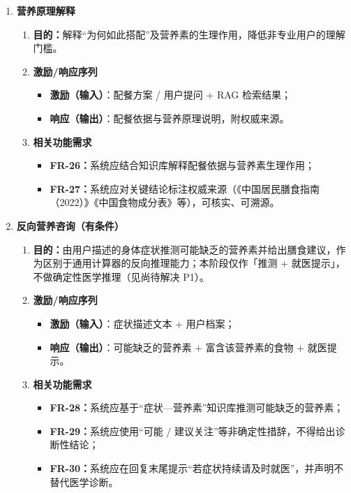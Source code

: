 \documentclass[12pt,a4paper]{ctexart}
\begin{document}
\begin{enumerate}
\item \textbf{营养原理解释}
  \begin{enumerate}[label=(\arabic*), leftmargin=10pt, itemsep=2pt, topsep=2pt]
    \item \textbf{目的：}解释“为何如此搭配”及营养素的生理作用，降低非专业用户的理解门槛。
    \item \textbf{激励/响应序列}
      \begin{itemize}[leftmargin=*, itemsep=1pt, topsep=1pt]
        \item \textbf{激励（输入）}：配餐方案 / 用户提问 + RAG 检索结果；
        \item \textbf{响应（输出）}：配餐依据与营养原理说明，附权威来源。
      \end{itemize}
    \item \textbf{相关功能需求}
      \begin{itemize}[leftmargin=*, itemsep=1pt, topsep=1pt]
        \item \textbf{FR-26：}系统应结合知识库解释配餐依据与营养素生理作用；
        \item \textbf{FR-27：}系统应对关键结论标注权威来源（《中国居民膳食指南（2022）》《中国食物成分表》等），可核实、可溯源。
      \end{itemize}
  \end{enumerate}

\item \textbf{反向营养咨询（有条件）}
  \begin{enumerate}[label=(\arabic*), leftmargin=10pt, itemsep=2pt, topsep=2pt]
    \item \textbf{目的：}由用户描述的身体症状推测可能缺乏的营养素并给出膳食建议，作为区别于通用计算器的反向推理能力；本阶段仅作「推测 + 就医提示」，不做确定性医学推理（见尚待解决 P1）。
    \item \textbf{激励/响应序列}
      \begin{itemize}[leftmargin=*, itemsep=1pt, topsep=1pt]
        \item \textbf{激励（输入）}：症状描述文本 + 用户档案；
        \item \textbf{响应（输出）}：可能缺乏的营养素 + 富含该营养素的食物 + 就医提示。
      \end{itemize}
    \item \textbf{相关功能需求}
      \begin{itemize}[leftmargin=*, itemsep=1pt, topsep=1pt]
        \item \textbf{FR-28：}系统应基于“症状---营养素”知识库推测可能缺乏的营养素；
        \item \textbf{FR-29：}系统应使用“可能 / 建议关注”等非确定性措辞，不得给出诊断性结论；
        \item \textbf{FR-30：}系统应在回复末尾提示“若症状持续请及时就医”，并声明不替代医学诊断。
      \end{itemize}
  \end{enumerate}
\end{enumerate}
\end{document}
